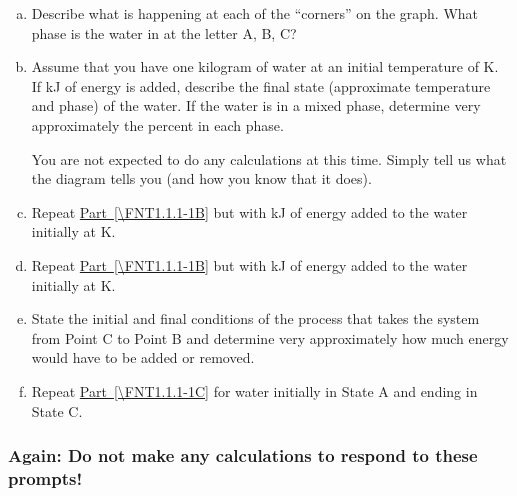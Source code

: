 \begin{enumerate}[(a)]
	\item Describe what is happening at each of the ``corners'' on the graph. What phase is the water in at the letter A, B, C?
	\label{FNT1.1.1-1A}
	
	\item Assume that you have one kilogram of water at an initial temperature of \unit[200]{K}. If \unit[795]{kJ} of energy is added, describe the final state (approximate temperature and phase) of the water. If the water is in a mixed phase, determine very approximately the percent in each phase.
	
		You are not expected to do any calculations at this time. Simply tell us what the diagram tells you (and how you know that it does).
	\label{FNT1.1.1-1B}
	
	\item Repeat \hyperref[\FNT1.1.1-1B]{Part~\ref*{\FNT1.1.1-1B}} but with \unit[146]{kJ} of energy added to the water initially at \unit[200]{K}.
	
	\item Repeat \hyperref[\FNT1.1.1-1B]{Part~\ref*{\FNT1.1.1-1B}} but with \unit[1650]{kJ} of energy added to the water initially at \unit[200]{K}.
	
	\item State the initial and final conditions of the process that takes the system from Point C to Point B and determine very approximately how much energy would have to be added or removed.
	\label{FNT1.1.1-1C}
	
	\item Repeat \hyperref[\FNT1.1.1-1C]{Part~\ref*{\FNT1.1.1-1C}} for water initially in State A and ending in State C.
	\label{FNT1.1.1-1D}
	
\end{enumerate}

\subsubsection*{Again: Do not make any calculations to respond to these prompts!}